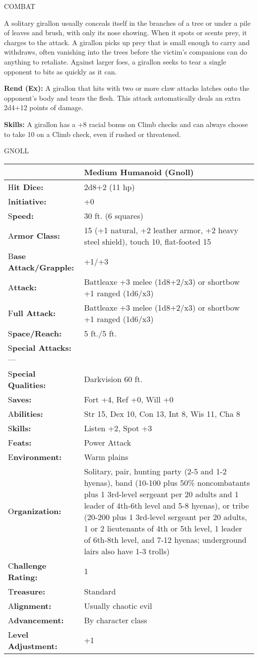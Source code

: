 \documentclass{article}
\begin{document}
COMBAT

A solitary girallon usually conceals itself in the branches of a tree or under 
a pile of leaves and brush, with only its nose showing. When it spots or scents 
prey, it charges to the attack. A girallon picks up prey that is small enough to 
carry and withdraws, often vanishing into the trees before the victim's companions 
can do anything to retaliate. Against larger foes, a girallon seeks to tear a single 
opponent to bits as quickly as it can.

\textbf{Rend (Ex):} A girallon that hits with two or more claw attacks latches 
onto the opponent's body and tears the flesh. This attack automatically deals an 
extra 2d4+12 points of damage.

\textbf{Skills:} A girallon has a +8 racial bonus on Climb checks and can always 
choose to take 10 on a Climb check, even if rushed or threatened.

\vspace{12pt}
{\LARGE{}GNOLL}

\begin{tabular}{|>{\raggedright}p{73pt}|>{\raggedright}p{252pt}|}
\hline
  & Medium Humanoid (Gnoll)\tabularnewline
\hline
H\textbf{it Dice:} & 2d8+2 (11 hp)\tabularnewline
\hline
I\textbf{nitiative:} & +0\tabularnewline
\hline
S\textbf{peed:} & 30 ft. (6 squares)\tabularnewline
\hline
A\textbf{rmor Class:} & 15 (+1 natural, +2 leather armor, +2 heavy steel shield), 
touch 10, flat-footed 15\tabularnewline
\hline
B\textbf{ase Attack/Grapple:} & +1/+3\tabularnewline
\hline
A\textbf{ttack:} & Battleaxe +3 melee (1d8+2/x3) or shortbow +1 ranged (1d6/x3)\tabularnewline
\hline
F\textbf{ull Attack:} & Battleaxe +3 melee (1d8+2/x3) or shortbow +1 ranged (1d6/x3)\tabularnewline
\hline
S\textbf{pace/Reach:} & 5 ft./5 ft.\tabularnewline
\hline
S\textbf{pecial Attacks:}--- & \tabularnewline
\hline
S\textbf{pecial Qualities:} & Darkvision 60 ft.\tabularnewline
\hline
S\textbf{aves:} & Fort +4, Ref +0, Will +0\tabularnewline
\hline
A\textbf{bilities:} & Str 15, Dex 10, Con 13, Int 8, Wis 11, Cha 8\tabularnewline
\hline
S\textbf{kills:} & Listen +2, Spot +3\tabularnewline
\hline
F\textbf{eats:} & Power Attack\tabularnewline
\hline
E\textbf{nvironment:} & Warm plains\tabularnewline
\hline
O\textbf{rganization:} & Solitary, pair, hunting party (2-5 and 1-2 hyenas), band 
(10-100 plus 50\% noncombatants plus 1 3rd-level sergeant per 20 adults and 1 leader 
of 4th-6th level and 5-8 hyenas), or tribe (20-200 plus 1 3rd-level sergeant per 
20 adults, 1 or 2 lieutenants of 4th or 5th level, 1 leader of 6th-8th level, and 
7-12 hyenas; underground lairs also have 1-3 trolls)\tabularnewline
\hline
C\textbf{hallenge Rating:} & 1\tabularnewline
\hline
T\textbf{reasure:} & Standard\tabularnewline
\hline
A\textbf{lignment:} & Usually chaotic evil\tabularnewline
\hline
A\textbf{dvancement:} & By character class\tabularnewline
\hline
L\textbf{evel Adjustment:} & +1\tabularnewline
\hline
\end{tabular}
\end{document}

